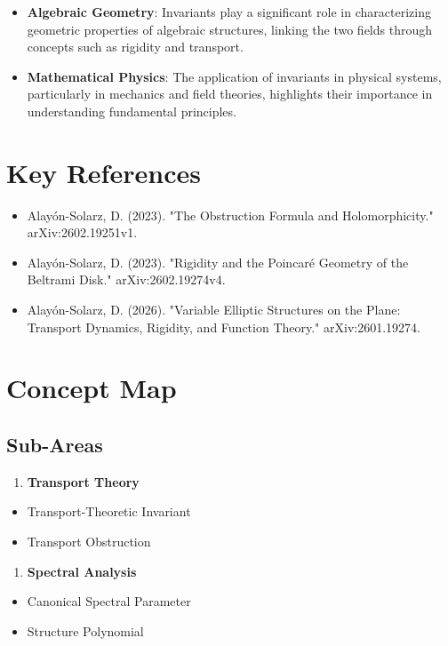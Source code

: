\documentclass[11pt,a4paper]{article}
\begin{document}
\begin{itemize}
\item \textbf{Algebraic Geometry}: Invariants play a significant role in characterizing geometric properties of algebraic structures, linking the two fields through concepts such as rigidity and transport.
\end{itemize}

\begin{itemize}
\item \textbf{Mathematical Physics}: The application of invariants in physical systems, particularly in mechanics and field theories, highlights their importance in understanding fundamental principles.
\end{itemize}

\section{Key References}

\begin{itemize}
\item Alayón-Solarz, D. (2023). "The Obstruction Formula and Holomorphicity." arXiv:2602.19251v1.
\item Alayón-Solarz, D. (2023). "Rigidity and the Poincaré Geometry of the Beltrami Disk." arXiv:2602.19274v4.
\item Alayón-Solarz, D. (2026). "Variable Elliptic Structures on the Plane: Transport Dynamics, Rigidity, and Function Theory." arXiv:2601.19274.
\end{itemize}

\section{Concept Map}

\subsection{Sub-Areas}

\begin{enumerate}
\item \textbf{Transport Theory}
\end{enumerate}
\begin{itemize}
\item Transport-Theoretic Invariant
\item Transport Obstruction
\end{itemize}

\begin{enumerate}
\item \textbf{Spectral Analysis}
\end{enumerate}
\begin{itemize}
\item Canonical Spectral Parameter
\item Structure Polynomial
\end{itemize}
\end{document}
